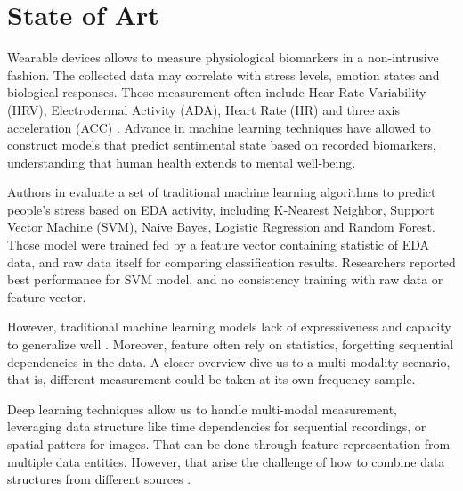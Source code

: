 \section{State of Art}


Wearable devices allows to measure physiological biomarkers in a non-intrusive fashion. The collected data may correlate with stress levels, emotion states and biological responses. Those measurement often include Hear Rate Variability (HRV), Electrodermal Activity (ADA), Heart Rate (HR) and three axis acceleration (ACC) \cite{Vos2023}. Advance in machine learning techniques have allowed to construct models that predict sentimental state based on recorded biomarkers, understanding that human health extends to mental well-being.

Authors in \cite{Zhu2023} evaluate a set of traditional machine learning algorithms to predict people's stress based on EDA activity, including K-Nearest Neighbor, Support Vector Machine (SVM), Naive Bayes, Logistic Regression and Random Forest. Those model were trained fed by a feature vector containing statistic of EDA data, and raw data itself for comparing classification results. Researchers reported best performance for SVM model, and no consistency training with raw data or feature vector.

However, traditional machine learning models lack of expressiveness and capacity to generalize well \cite{Yang2023}. Moreover, feature often rely on statistics, forgetting sequential dependencies in the data. A closer overview dive us to a multi-modality scenario, that is, different measurement could be taken at its own frequency sample.

Deep learning techniques allow us to handle multi-modal measurement, leveraging data structure like time dependencies for sequential recordings, or spatial patters for images. That can be done through feature representation from multiple data entities. However, that arise the challenge of how to combine data structures from different sources \cite{Baltrusaitis2019,Liang2024}. 



